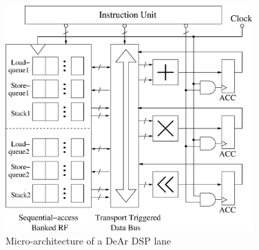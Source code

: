 \vspace{\textfig}
\begin{figure}[!ht] 
    \centering
    \includegraphics[width=0.85\textwidth]{./figs/micro.eps}
    \caption{Micro-architecture of a DeAr DSP lane}
    \label{fig:micro}
\end{figure}


